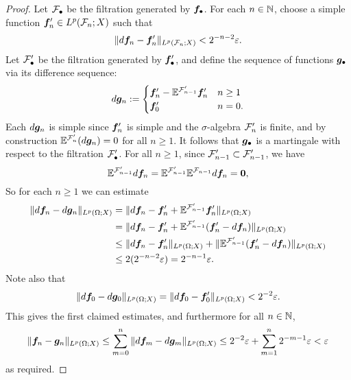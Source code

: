 \begin{proof}
  Let $\mathcal{F}_{\bullet}$ be the filtration generated by $\bm{f}_{\bullet}$.
  For each $n \in \mathbb{N}$, choose a simple function $\bm{f}_{n}' \in L^p(\mathcal{F}_{n};X)$ such that
  \begin{equation*}
    \|d\bm{f}_{n} - \bm{f}_{n}'\|_{L^p(\mathcal{F}_{n};X)} < 2^{-n-2}\varepsilon.
  \end{equation*}
  Let $\mathcal{F}'_{\bullet}$ be the filtration generated by $\bm{f}'_{\bullet}$, and define the sequence of functions $\bm{g}_{\bullet}$ via its difference sequence:
  \begin{equation*}
    d\bm{g}_{n} :=
    \begin{cases} \bm{f}'_{n} - \mathbb{E}^{\mathcal{F}'_{n-1}} \bm{f}'_{n} & n \geq 1 \\
      \bm{f}'_{0} & n = 0.
    \end{cases}
  \end{equation*}
  Each $d\bm{g}_{n}$ is simple since $\bm{f}'_{n}$ is simple and the $\sigma$-algebra $\mathcal{F}'_{n}$ is finite, and by construction $\mathbb{E}^{\mathcal{F}'_{n}}(d\bm{g}_{n}) = 0$ for all $n \geq 1$.
  It follows that $\bm{g}_{\bullet}$ is a martingale with respect to the filtration $\mathcal{F}'_{\bullet}$.
  For all $n \geq 1$, since $\mathcal{F}_{n-1}' \subset \mathcal{F}_{n-1}'$, we have
  \begin{equation*}
    \mathbb{E}^{\mathcal{F}_{n-1}'} d\bm{f}_{n} = \mathbb{E}^{\mathcal{F}_{n-1}'}\mathbb{E}^{\mathcal{F}_{n-1}} d\bm{f}_{n} = \bm{0},
  \end{equation*}
  So for each $n \geq 1$ we can estimate
  \begin{equation*}
    \begin{aligned}
      \|d\bm{f}_{n} - d\bm{g}_{n}\|_{L^p(\Omega;X)}
      &= \|d\bm{f}_{n} - \bm{f}_{n}' + \mathbb{E}^{\mathcal{F}_{n-1}'} \bm{f}_{n}'\|_{L^p(\Omega;X)} \\
      &= \|d\bm{f}_{n} - \bm{f}_{n}' + \mathbb{E}^{\mathcal{F}_{n-1}'} (\bm{f}_{n}' - d\bm{f}_{n})\|_{L^p(\Omega;X)} \\
      &\leq \|d\bm{f}_{n} - \bm{f}_{n}'\|_{L^p(\Omega;X)} + \|\mathbb{E}^{\mathcal{F}_{n-1}'} (\bm{f}_{n}' - d\bm{f}_{n})\|_{L^p(\Omega;X)} \\
      &\leq 2(2^{-n-2}\varepsilon) = 2^{-n-1}\varepsilon.
    \end{aligned}
  \end{equation*}
  Note also that
  \begin{equation*}
    \|d\bm{f}_{0} - d\bm{g}_{0}\|_{L^p(\Omega;X)} = \|d\bm{f}_{0} - \bm{f}_{0}'\|_{L^p(\Omega;X)} < 2^{-2}\varepsilon.
  \end{equation*}
  This gives the first claimed estimates, and furthermore  for all $n \in \mathbb{N}$,
  \begin{equation*}
    \|\bm{f}_{n} - \bm{g}_{n}\|_{L^p(\Omega;X)}
    \leq \sum_{m=0}^{n} \|d\bm{f}_{m} - d\bm{g}_{m}\|_{L^p(\Omega;X)} 
    \leq 2^{-2} \varepsilon + \sum_{m=1}^{n} 2^{-m-1}\varepsilon < \varepsilon
  \end{equation*}
  as required.
\end{proof}

